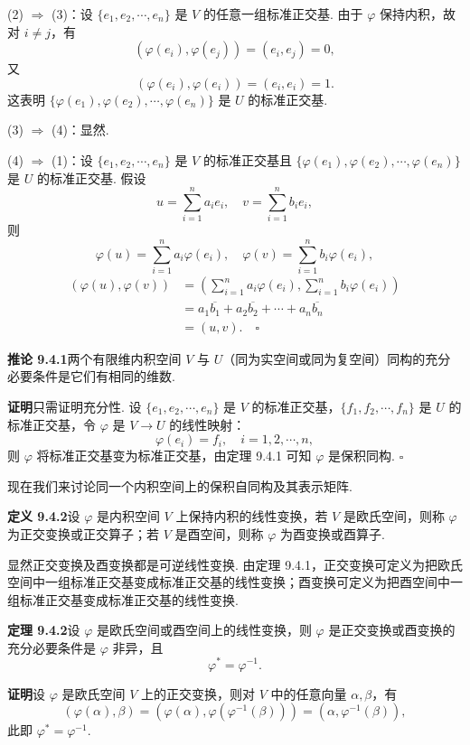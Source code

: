 \documentclass[UTF8,12pt,a4paper,fontset=fandol]{ctexart}
\begin{document}
(2) $\Rightarrow$ (3)：设 $\{e_1,e_2,\cdots,e_n\}$ 是 $V$ 的任意一组标准正交基. 由于 $\varphi$ 保持内积，故对 $i\ne j$，有
\[
  (\varphi(e_i),\varphi(e_j))=(e_i,e_j)=0,
\]
又
\[
  (\varphi(e_i),\varphi(e_i))=(e_i,e_i)=1.
\]
这表明 $\{\varphi(e_1),\varphi(e_2),\cdots,\varphi(e_n)\}$ 是 $U$ 的标准正交基.

(3) $\Rightarrow$ (4)：显然.

(4) $\Rightarrow$ (1)：设 $\{e_1,e_2,\cdots,e_n\}$ 是 $V$ 的标准正交基且 $\{\varphi(e_1),\varphi(e_2),\cdots,\varphi(e_n)\}$ 是 $U$ 的标准正交基. 假设
\[
  u=\sum_{i=1}^n a_ie_i,\quad v=\sum_{i=1}^n b_ie_i,
\]
则
\[
  \varphi(u)=\sum_{i=1}^n a_i\varphi(e_i),\quad
  \varphi(v)=\sum_{i=1}^n b_i\varphi(e_i),
\]
\[
\begin{aligned}
  (\varphi(u),\varphi(v))
  &=
  \left(\sum_{i=1}^n a_i\varphi(e_i),\sum_{i=1}^n b_i\varphi(e_i)\right)\\
  &=a_1\overline{b_1}+a_2\overline{b_2}+\cdots+a_n\overline{b_n}\\
  &=(u,v). \quad \square
\end{aligned}
\]

\noindent\textbf{推论 9.4.1}\quad 两个有限维内积空间 $V$ 与 $U$（同为实空间或同为复空间）同构的充分必要条件是它们有相同的维数.

\noindent\textbf{证明}\quad 只需证明充分性. 设 $\{e_1,e_2,\cdots,e_n\}$ 是 $V$ 的标准正交基，$\{f_1,f_2,\cdots,f_n\}$ 是 $U$ 的标准正交基，令 $\varphi$ 是 $V\to U$ 的线性映射：
\[
  \varphi(e_i)=f_i,\quad i=1,2,\cdots,n,
\]
则 $\varphi$ 将标准正交基变为标准正交基，由定理 9.4.1 可知 $\varphi$ 是保积同构. $\square$

现在我们来讨论同一个内积空间上的保积自同构及其表示矩阵.

\noindent\textbf{定义 9.4.2}\quad 设 $\varphi$ 是内积空间 $V$ 上保持内积的线性变换，若 $V$ 是欧氏空间，则称 $\varphi$ 为正交变换或正交算子；若 $V$ 是酉空间，则称 $\varphi$ 为酉变换或酉算子.

显然正交变换及酉变换都是可逆线性变换. 由定理 9.4.1，正交变换可定义为把欧氏空间中一组标准正交基变成标准正交基的线性变换；酉变换可定义为把酉空间中一组标准正交基变成标准正交基的线性变换.

\noindent\textbf{定理 9.4.2}\quad 设 $\varphi$ 是欧氏空间或酉空间上的线性变换，则 $\varphi$ 是正交变换或酉变换的充分必要条件是 $\varphi$ 非异，且
\[
  \varphi^*=\varphi^{-1}.
\]

\noindent\textbf{证明}\quad 设 $\varphi$ 是欧氏空间 $V$ 上的正交变换，则对 $V$ 中的任意向量 $\alpha,\beta$，有
\[
  (\varphi(\alpha),\beta)=(\varphi(\alpha),\varphi(\varphi^{-1}(\beta)))=(\alpha,\varphi^{-1}(\beta)),
\]
此即 $\varphi^*=\varphi^{-1}$.
\end{document}
